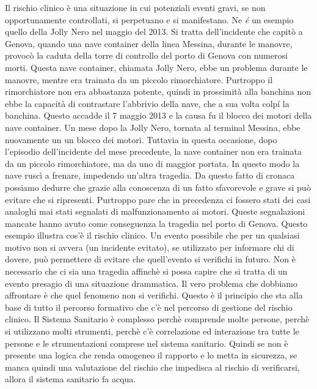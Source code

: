 Il rischio clinico è una situazione in cui potenziali eventi gravi, se
non opportunamente controllati, si perpetuano e si manifestano. Ne
\emph{é} un esempio quello della Jolly Nero nel maggio del 2013. Si
tratta dell'incidente che capitò a Genova, quando una nave container
della linea Messina, durante le manovre, provocò la caduta della torre
di controllo del porto di Genova con numerosi morti. Questa nave
container, chiamata Jolly Nero, ebbe un problema durante le manovre,
mentre era trainata da un piccolo rimorchiatore. Purtroppo il
rimorchiatore non era abbastanza potente, quindi in prossimità alla
banchina non ebbe la capacità di contrastare l'abbrivio della nave, che
a sua volta colpí la banchina. Questo accadde il 7 maggio 2013 e la
causa fu il blocco dei motori della nave container. Un mese dopo la
Jolly Nero, tornata al terminal Messina, ebbe nuovamente un un blocco
dei motori. Tuttavia in questa occasione, dopo l'episodio dell'incidente
del mese precedente, la nave container non era trainata da un piccolo
rimorchiatore, ma da uno di maggior portata. In questo modo la nave
ruscì a frenare, impedendo un'altra tragedia. Da questo fatto di cronaca
possiamo dedurre che grazie alla conoscenza di un fatto sfavorevole e
grave si può evitare che si ripresenti. Purtroppo pare che in precedenza
ci fossero stati dei casi analoghi mai stati segnalati di
malfunzionamento ai motori. Queste segnalazioni mancate hanno avuto come
conseguenza la tragedia nel porto di Genova. Questo esempio illustra
cos'è il rischio clinico. Un evento possibile che per un qualsiasi
motivo non si avvera (un incidente evitato), se utilizzato per informare
chi di dovere, può permettere di evitare che quell'evento si verifichi
in futuro. Non è necessario che ci sia una tragedia affinchè si possa
capire che si tratta di un evento presagio di una situazione drammatica.
Il vero problema che dobbiamo affrontare è che quel fenomeno non si
verifichi. Questo è il principio che sta alla base di tutto il percorso
formativo che c'è nel percorso di gestione del rischio clinico. Il
Sistema Sanitario è complesso perchè comprende molte persone, perchè si
utilizzano molti strumenti, perchè c'è correlazione ed interazione tra
tutte le persone e le strumentazioni comprese nel sistema sanitario.
Quindi se non è presente una logica che renda omogeneo il rapporto e lo
metta in sicurezza, se manca quindi una valutazione del rischio che
impedisca al rischio di verificarsi, allora il sistema sanitario fa
acqua.
